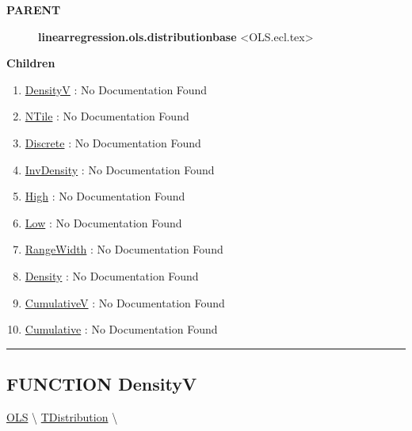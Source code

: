\par
\begin{description}
\item [\colorbox{tagtype}{\color{white} \textbf{\textsf{PARENT}}}] \textbf{linearregression.ols.distributionbase} <OLS.ecl.tex>
\end{description}


\textbf{Children}
\begin{enumerate}
\item \hyperlink{ecldoc:linearregression.ols.distributionbase.densityv}{DensityV}
: No Documentation Found
\item \hyperlink{ecldoc:linearregression.ols.distributionbase.ntile}{NTile}
: No Documentation Found
\item \hyperlink{ecldoc:linearregression.ols.distributionbase.discrete}{Discrete}
: No Documentation Found
\item \hyperlink{ecldoc:linearregression.ols.tdistribution.invdensity}{InvDensity}
: No Documentation Found
\item \hyperlink{ecldoc:linearregression.ols.tdistribution.high}{High}
: No Documentation Found
\item \hyperlink{ecldoc:linearregression.ols.tdistribution.low}{Low}
: No Documentation Found
\item \hyperlink{ecldoc:linearregression.ols.tdistribution.rangewidth}{RangeWidth}
: No Documentation Found
\item \hyperlink{ecldoc:linearregression.ols.tdistribution.density}{Density}
: No Documentation Found
\item \hyperlink{ecldoc:linearregression.ols.tdistribution.cumulativev}{CumulativeV}
: No Documentation Found
\item \hyperlink{ecldoc:linearregression.ols.tdistribution.cumulative}{Cumulative}
: No Documentation Found
\end{enumerate}

\rule{\linewidth}{0.5pt}

\subsection*{\textsf{\colorbox{headtoc}{\color{white} FUNCTION}
DensityV}}

\hypertarget{ecldoc:linearregression.ols.distributionbase.densityv}{}
\hspace{0pt} \hyperlink{ecldoc:linearregression.ols}{OLS} \textbackslash 
\hspace{0pt} \hyperlink{ecldoc:linearregression.ols.tdistribution}{TDistribution} \textbackslash 

